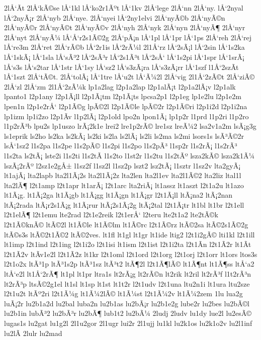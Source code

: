 {2lÅ‘Ã­t
2lÅ‘kÃ©se
lÅ‘1kl
lÅ‘ko2r1Ãºt
lÅ‘1kv
2lÅ‘lege
2lÅ‘nn
2lÅ‘ny.
lÅ‘2nyal
lÅ‘2nyÃ¡r
2lÅ‘nyb
2lÅ‘nye.
2lÅ‘nyei
lÅ‘2ny1elvi
2lÅ‘nyÃ©b
2lÅ‘nyÃ©n
2lÅ‘nyÃ©r
2lÅ‘nyÃ©t
2lÅ‘nyÃ©v
2lÅ‘nyh
2lÅ‘nyk
2lÅ‘nyn
2lÅ‘nyÃ¶
2lÅ‘nyr
2lÅ‘nyt
2lÅ‘nyÃ¼
lÅ‘Å‘r2s1Ã©2g
2lÅ‘pÃ¡n
lÅ‘1pl
lÅ‘1pr
lÅ‘1ps
2lÅ‘reh
2lÅ‘rej
lÅ‘re3m
2lÅ‘ret
2lÅ‘rÃ©b
lÅ‘2r1is
lÅ‘2rÃ¼l
2l1Å‘rz
lÅ‘2sÃ¡l
lÅ‘2sin
lÅ‘1s2ka
lÅ‘1skÃ¡
lÅ‘1sla
lÅ‘sÃ³2
lÅ‘2sÃ³r
lÅ‘2s1Ã³t
lÅ‘2sÅ‘
lÅ‘1s2pi
lÅ‘1spr
lÅ‘1srÃ¡
lÅ‘s3s
lÅ‘s2tar
lÅ‘1str
lÅ‘1sy
lÅ‘sz2
lÅ‘s3zÃ¡ra
lÅ‘s3zÃ¡rr
lÅ‘1szf
l1Å‘2szÃ­t
lÅ‘1szt
2lÅ‘tÃ©t.
2lÅ‘tolÃ¡
lÅ‘1tre
lÅ‘u2t
lÅ‘Ã¼2l
2lÅ‘vig
2l1Å‘2zÃ©t
2lÅ‘ziÃ©
2lÅ‘zl
2lÅ‘zm
2l1Å‘2zÃ¼k
lp1a2lag
l2p1a2lap
l2p1alÃ¡t
l2p1a2lÃ¡v
l2p1alk
lpanto1
l2p1any
l2p1Ã¡ll
l2p1Ã¡tm
l2p1Ã¡ts
lpcsa2p1
l2p1eg
lp1e2lu
l2p1e2m
lpen1n
l2p1e2rÅ‘
l2p1Ã©g
lpÃ©2l
l2p1Ã©le
lpÃ©2r
l2p1Ã©ri
l2p1i2d
l2p1i2na
lp1izm
lp1i2zo
l2p1Ã­v
l1p2lÃ¡
l2p1old
lpo2n
lpon1Ã¡
lp1p2r
l1prd
l1p2ri
l1p2ro
l1p2rÃ³b
lpu2s
lp1uszo
lrÃ¡2k1e
lrei2
lre1p2rÃ©
lre1sz
lreÃ¼2
lsa2v1a2m
lsÃ¡g3g
ls1eprik
ls2ho
ls2ka
ls2kÃ¡
ls2ki
ls2la
ls2lÃ¡
ls2li
ls2ma
ls2mi
lsors1s
lsÃ³Ã©2r
lsÅ‘1sz2
l1s2pa
l1s2pe
l1s2pÃ©
l1s2pi
l1s2po
l1s2pÃ³
l1sp2r
l1s2rÃ¡
l1s2rÃ³
l1s2ta
ls2tÃ¡
lste2i
l1s2ti
l1s2tÃ­
l1s2to
l1st2r
l1s2tu
l1s2tÃº
lsza2kÃ©
lsza2k1Ã¼
lszÃ¡2rÃº
l2sz1e2gÅ±
l1sz2f
l1sz2l
l1sz2p
lszt2
lsz2tÃ¡
l1sztr
l1sz2v
lta2gyÃ¡
lt1ajÃ¡
lta2lapb
lta2l1Ã¡2s
lta2l1Ã¡2z
lta2len
lta2l1ev
lta2l1Ã©2
lta2liz
ltal1l
lta2lÃ¶
l2t1amp
l2t1apr
lt1arÃ¡
l2t1arc
lta2riÃ¡
lt1assz
lt1aszt
l2t1a2u
lt1azo
lt1Ã¡g.
lt1Ã¡2ga
lt1Ã¡gb
lt1Ã¡gg
lt1Ã¡gn
lt1Ã¡gr
l2t1Ã¡ll
ltÃ¡na2
ltÃ¡2nan
ltÃ¡2rada
ltÃ¡r2s1Ã¡g
lt1Ã¡rur
ltÃ¡2s1Ã¡2g
ltÃ¡2tal
l2t1Ã¡tr
lt1bl
lt1br
l2t1ell
l2t1elÃ¶
l2t1emu
lte2rad
l2t1e2reik
l2t1erÅ‘
l2teru
lte2t1a2
lte2tÃ©k
l2t1Ã©knÃ©
ltÃ©2l
lt1Ã©le
lt1Ã©lm
lt1Ã©rc
l2t1Ã©rz
ltÃ©2sa
ltÃ©2s1Ã©2g
ltÃ©s3s
ltÃ©2t1Ã©2
ltÃ©2ves.
lt1fl
lt1gl
lt1gr
lt1ide
ltig2
l2t1i2gÃ©
lti1kl
l2t1ill
lt1imp
l2t1ind
l2t1ing
l2t1i2o
l2t1isi
lt1ism
l2t1ist
l2t1i2ta
l2t1Ã­n
l2t1Ã­2r
lt1Ã­t
l2t1Ã­2v
ltÃ­v1e2l
l2t1Ã­2z
lt1kr
l2t1oml
l2t1ord
l2t1org
l2t1orj
l2t1orr
lt1ors
ltos3s
l2t1o2x
ltÃ³1p
ltÃ³1s2p
ltÃ³1sz
ltÃ³t2
ltÃ¶2l
l2t1Ã¶lÃ©
lt1Ã¶nt
lt1Ã¶ss
ltÅ‘a2
ltÅ‘e2l
lt1Å‘2rÃ¶
lt1pl
lt1pr
ltra1s
lt2rÃ¡g
lt2rÃ©n
lt2rik
lt2ril
lt2rÃ³f
l1t2rÃ³n
lt2rÃ³p
ltsÃ©2g1el
lt1sl
lt1sp
lt1st
lt1t2r
l2t1udv
l2t1una
ltu2n1i
lt1ura
ltu2sze
l2t1u2t
ltÃº2ri
l2t1Ã¼g
lt1Ã¼2lÃ©
lt1Ã¼st
l2t1Ã¼2v
lt1Ã¼2zem
1lu
lua2g
luÃ¡2r
lu2b1a2d
lu2bal
luba2n
lu2b1as
lu2bÃ¡r
lu2b1e2g
lube2r
lu2bes
lu2bÃ©l
lu2b1in
lubÃ³2
lu2bÃ³r
lu2bÃ¶
lub1t2
lu2bÃ¼
2ludj
2ludv
lu1dy
lue2l
lu2esÃ©
lugas1s
lu2gat
lu1g2l
2l1u2gor
2l1ugr
lui2r
2l1ujj
lu1kl
lu2k1os
lu2k1o2v
lu2l1inf
lu2lÃ­
2lulr
lu2mad
}
